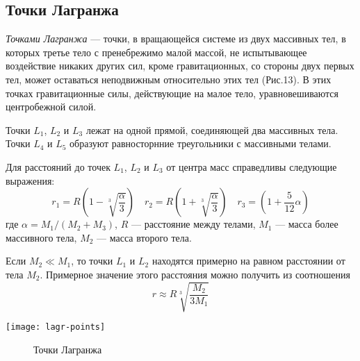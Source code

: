\subsection{Точки Лагранжа}

{\itshape Точками Лагранжа} --- точки, в вращающейся системе из двух
массивных тел, в которых третье тело с пренебрежимо 
малой массой, не испытывающее воздействие никаких 
других сил, кроме гравитационных, со стороны двух 
первых тел, может оставаться неподвижным относительно 
этих тел (Рис.13). В этих точках гравитационные силы, действующие на малое тело, уравновешиваются центробежной силой.

Точки $L_1$, $L_2$ и $L_3$ лежат на одной прямой, 
соединяющей два массивных тела. Точки $L_4$ и $L_5$ 
образуют равносторнние треугольники с массивными 
телами.

Для расстояний до точек $L_1$, $L_2$ и $L_3$ от 
центра масс справедливы следующие выражения:
\begin{equation}r_1=R\left(1-\sqrt[3]{\frac{\alpha}
{3}}\right) \quad r_2=R\left(1+\sqrt[3]{\frac{\alpha}
{3}}\right) \quad r_3=\left(1+\frac{5}{12}\alpha\right)
\end{equation}
где $\alpha=M_1/(M_2+M_3)$, $R$ --- расстояние между 
телами, $M_1$ --- масса более массивного тела, $M_2$
 --- масса второго тела.

Если $M_2\ll M_1$, то точки $L_1$ и $L_2$ находятся 
примерно на равном расстоянии от тела $M_2$. 
Примерное значение этого расстояния можно получить
из соотношения
\begin{equation}r\approx R\sqrt[3]{\frac{M_2}{3M_1}}
\end{equation}
\begin{center}
\texttt{[image: lagr-points]}
\begin{figure}[h!]
\caption{Точки Лагранжа}\label{pic:lagr-points}
\end{figure}
\end{center}